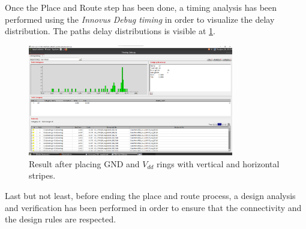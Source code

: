 Once the Place and Route step has been done, a timing analysis has been performed using the \textit{Innovus Debug timing} in order to visualize the delay distribution. The paths delay distributions is visible at \ref{fig:innovus_delay}.
\begin{figure}[h]   
	\centering
	\includegraphics[width=0.8\textwidth]{chapters/9_PhysicalDesign/images/innvous_delay.png}
	\caption{Result after placing GND and $V_{dd}$ rings with vertical and horizontal stripes.}
	\label{fig:innovus_delay}
\end{figure}

Last but not least, before ending the place and route process, a design analysis and verification has been performed in order to ensure that the connectivity and the design rules are respected.